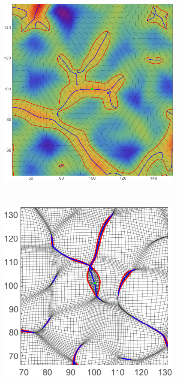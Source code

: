 \documentclass[a4paper, 11pt]{article}
\begin{document}
\begin{figure}
\begin{subfigure}[b]{0.32\textwidth}
\end{subfigure}~
\begin{subfigure}[b]{0.32\textwidth}
\includegraphics[width=\textwidth]{Rotation_L_3}
\end{subfigure}\\
\begin{subfigure}[b]{0.32\textwidth}
\includegraphics[width=\textwidth]{Rotation_Z_1}

\end{subfigure}
\end{figure}
\end{document}
